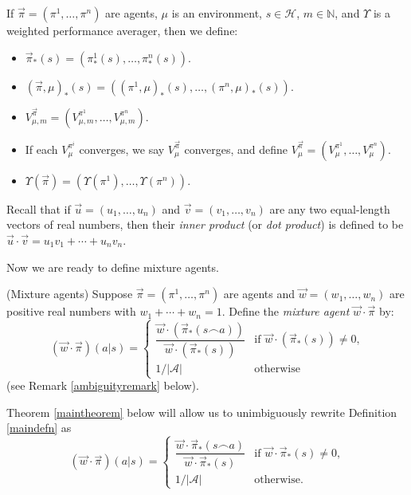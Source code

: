 \documentclass[runningheads]{llncs}
\begin{document}
\begin{definition}
    If $\vec\pi=(\pi^1,\ldots,\pi^n)$ are agents, $\mu$ is an environment,
    $s\in\mathcal H$, $m\in\mathbb N$, and $\Upsilon$ is a weighted
    performance averager, then we define:
    \begin{itemize}
        \item $\vec\pi_*(s)=(\pi^1_*(s),\ldots,\pi^n_*(s))$.
        \item $(\vec\pi,\mu)_*(s)=((\pi^1,\mu)_*(s),\ldots,(\pi^n,\mu)_*(s))$.
        \item $V^{\vec\pi}_{\mu,m}=(V^{\pi^1}_{\mu,m},\ldots,V^{\pi^n}_{\mu,m})$.
        \item If each $V^{\pi^i}_\mu$ converges, we say $V^{\vec\pi}_\mu$
            converges, and define $V^{\vec\pi}_\mu=(V^{\pi^1}_\mu,\ldots,V^{\pi^n}_\mu)$.
        \item $\Upsilon(\vec\pi)=(\Upsilon(\pi^1),\ldots,\Upsilon(\pi^n))$.
    \end{itemize}
    Recall that if $\vec u=(u_1,\ldots,u_n)$ and
    $\vec v=(v_1,\ldots,v_n)$ are any two equal-length
    vectors of real numbers, then their \emph{inner product}
    (or \emph{dot product}) is defined to be
    $\vec u\cdot \vec v=u_1v_1+\cdots+u_nv_n$.
\end{definition}

Now we are ready to define mixture agents.

\begin{definition}
\label{maindefn}
    (Mixture agents)
    Suppose $\vec\pi=(\pi^1,\ldots,\pi^n)$ are agents and $\vec w=(w_1,\ldots,w_n)$
    are positive real numbers with $w_1+\cdots+w_n=1$.
    Define the \emph{mixture agent}
    $\vec w\cdot\vec\pi$ by:
    \[
        (\vec w\cdot\vec\pi)(a|s)
        =
        \begin{cases}
            \dfrac{\vec w\cdot (\vec\pi_*(s\frown a))}{\vec w\cdot (\vec\pi_*(s))}
            &\mbox{if $\vec w\cdot (\vec\pi_*(s))\not=0$,}\\
            1/|\mathcal{A}| &\mbox{otherwise}
        \end{cases}
    \]
    (see Remark \ref{ambiguityremark} below).
\end{definition}

\begin{remark}
\label{ambiguityremark}
    Theorem \ref{maintheorem} below will allow us to unimbiguously
    rewrite Definition \ref{maindefn} as
    \[
        (\vec w\cdot\vec\pi)(a|s)
        =
        \begin{cases}
            \dfrac{\vec w\cdot \vec\pi_*(s\frown a)}{\vec w\cdot \vec\pi_*(s)}
            &\mbox{if $\vec w\cdot \vec\pi_*(s)\not=0$,}\\
            1/|\mathcal{A}| &\mbox{otherwise.}
        \end{cases}
    \]
\end{remark}
\end{document}
